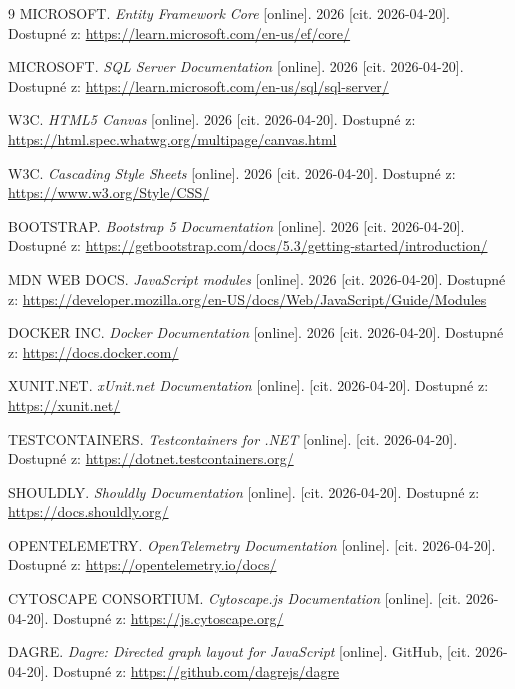 \documentclass[
  master,
  program=ainfvs,
  printversion,
  figures=false,
  tables=false,
  glossaries,
  index
]{kidiplom}
\begin{document}
\begin{thebibliography}{9}
 \uppercase{Microsoft}. \textit{Entity Framework Core} [online]. 2026 [cit. 2026-04-20]. Dostupné z: \url{https://learn.microsoft.com/en-us/ef/core/}

 \uppercase{Microsoft}. \textit{SQL Server Documentation} [online]. 2026 [cit. 2026-04-20]. Dostupné z: \url{https://learn.microsoft.com/en-us/sql/sql-server/}

 \uppercase{W3C}. \textit{HTML5 Canvas} [online]. 2026 [cit. 2026-04-20]. Dostupné z: \url{https://html.spec.whatwg.org/multipage/canvas.html}

 \uppercase{W3C}. \textit{Cascading Style Sheets} [online]. 2026 [cit. 2026-04-20]. Dostupné z: \url{https://www.w3.org/Style/CSS/}

 \uppercase{Bootstrap}. \textit{Bootstrap 5 Documentation} [online]. 2026 [cit. 2026-04-20]. Dostupné z: \url{https://getbootstrap.com/docs/5.3/getting-started/introduction/}

 \uppercase{MDN Web Docs}. \textit{JavaScript modules} [online]. 2026 [cit. 2026-04-20]. Dostupné z: \url{https://developer.mozilla.org/en-US/docs/Web/JavaScript/Guide/Modules}

 \uppercase{Docker Inc.} \textit{Docker Documentation} [online]. 2026 [cit. 2026-04-20]. Dostupné z: \url{https://docs.docker.com/}

 \uppercase{xUnit.net}. \textit{xUnit.net Documentation} [online]. [cit. 2026-04-20]. Dostupné z: \url{https://xunit.net/}

 \uppercase{Testcontainers}. \textit{Testcontainers for .NET} [online]. [cit. 2026-04-20]. Dostupné z: \url{https://dotnet.testcontainers.org/}

 \uppercase{Shouldly}. \textit{Shouldly Documentation} [online]. [cit. 2026-04-20]. Dostupné z: \url{https://docs.shouldly.org/}

 \uppercase{OpenTelemetry}. \textit{OpenTelemetry Documentation} [online]. [cit. 2026-04-20]. Dostupné z: \url{https://opentelemetry.io/docs/}

 \uppercase{Cytoscape Consortium}. \textit{Cytoscape.js Documentation} [online]. [cit. 2026-04-20]. Dostupné z: \url{https://js.cytoscape.org/}

 \uppercase{Dagre}. \textit{Dagre: Directed graph layout for JavaScript} [online]. GitHub, [cit. 2026-04-20]. Dostupné z: \url{https://github.com/dagrejs/dagre}


\end{thebibliography}
\end{document}

